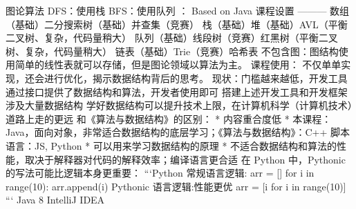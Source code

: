 {}\markdownRendererUlBeginTight
\markdownRendererUlItem 图论算法 DFS：使用栈 BFS：使用队列\markdownRendererUlItemEnd 
\markdownRendererUlEndTight \markdownRendererOlItemEnd 
\markdownRendererOlEnd \markdownRendererInterblockSeparator
{}： Based on Java\markdownRendererInterblockSeparator
{}\markdownRendererPipe{}\markdownRendererPipe{}课程设置\markdownRendererPipe{}\markdownRendererPipe{} \markdownRendererPipe{}---\markdownRendererPipe{}---\markdownRendererPipe{}---\markdownRendererPipe{} \markdownRendererPipe{}数组（基础）\markdownRendererPipe{}二分搜索树（基础）\markdownRendererPipe{}并查集（竞赛）\markdownRendererPipe{} \markdownRendererPipe{}栈（基础）\markdownRendererPipe{}堆（基础）\markdownRendererPipe{}AVL（平衡二叉树、复杂，代码量稍大）\markdownRendererPipe{} \markdownRendererPipe{}队列（基础）\markdownRendererPipe{}线段树（竞赛）\markdownRendererPipe{}红黑树（平衡二叉树、复杂，代码量稍大）\markdownRendererPipe{} \markdownRendererPipe{}链表（基础）\markdownRendererPipe{}Trie（竞赛）\markdownRendererPipe{}哈希表\markdownRendererPipe{}\markdownRendererInterblockSeparator
{}不包含图：图结构使用简单的线性表就可以存储，但是图论领域以算法为主。\markdownRendererInterblockSeparator
{}课程使用：\markdownRendererInterblockSeparator
{}不仅单单实现，还会进行优化，揭示数据结构背后的思考。\markdownRendererInterblockSeparator
{}\markdownRendererInterblockSeparator
{}现状：门槛越来越低，开发工具通过接口提供了数据结构和算法，开发者使用即可 搭建上述开发工具和开发框架涉及大量数据结构 \markdownRendererInterblockSeparator
{}学好数据结构可以提升技术上限，在计算机科学（计算机技术）道路上走的更远\markdownRendererInterblockSeparator
{}\markdownRendererInterblockSeparator
{}和《算法与数据结构》的区别： * 内容重合度低 * 本课程：Java，面向对象，非常适合数据结构的底层学习；《算法与数据结构》：C++\markdownRendererInterblockSeparator
{}脚本语言：JS, Python * 可以用来学习数据结构的原理 * 不适合数据结构和算法的性能，取决于解释器对代码的解释效率；编译语言更合适\markdownRendererInterblockSeparator
{}在 Python 中，Pythonic 的写法可能比逻辑本身更重要： ```Python 常规语言逻辑: arr = [] for i in range(10): arr.append(i)\markdownRendererInterblockSeparator
{}Pythonic 语言逻辑:性能更优 arr = [i for i in range(10)] ```\markdownRendererInterblockSeparator
{}\markdownRendererInterblockSeparator
{}Java 8 IntelliJ IDEA\relax